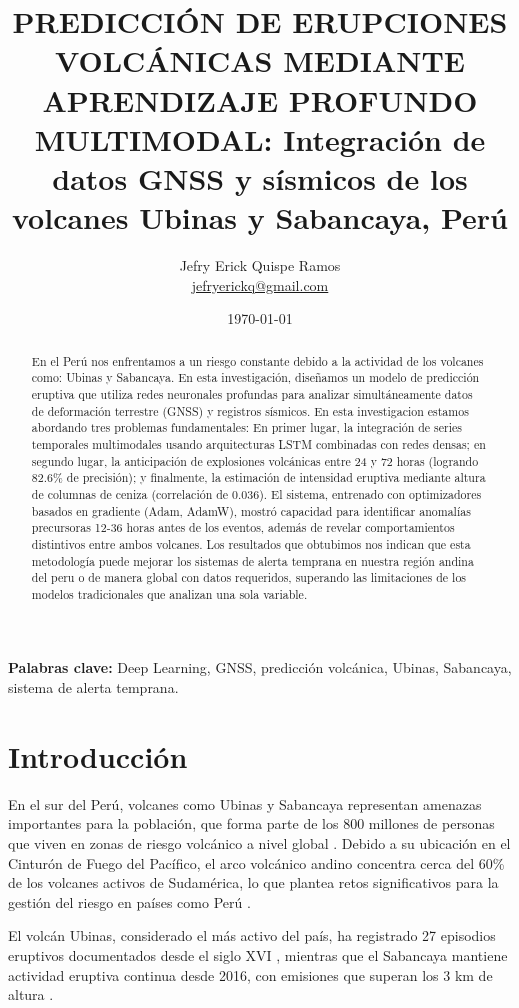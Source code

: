 \documentclass[11pt, a4paper, twocolumn]{article}  %
\title{\bfseries PREDICCIÓN DE ERUPCIONES VOLCÁNICAS MEDIANTE APRENDIZAJE PROFUNDO MULTIMODAL:  Integración de datos GNSS y sísmicos de los volcanes Ubinas y Sabancaya, Perú}
\author{
    Jefry Erick Quispe Ramos \\
    \small \href{mailto:jefryerickq@gmail.com}{jefryerickq@gmail.com} %
}
\date{\today}
\begin{document}
\maketitle



\begin{abstract}
En el Perú nos enfrentamos a un riesgo constante debido a la actividad de los volcanes como: Ubinas y Sabancaya. En esta investigación, diseñamos un modelo de predicción eruptiva que utiliza redes neuronales profundas para analizar simultáneamente datos de deformación terrestre (GNSS) y registros sísmicos. En esta investigacion estamos abordando tres problemas fundamentales: En primer lugar, la integración de series temporales multimodales usando arquitecturas LSTM combinadas con redes densas; en segundo lugar, la anticipación de explosiones volcánicas entre 24 y 72 horas (logrando 82.6\% de precisión); y finalmente, la estimación de intensidad eruptiva mediante altura de columnas de ceniza (correlación de 0.036). El sistema, entrenado con optimizadores basados en gradiente (Adam, AdamW), mostró capacidad para identificar anomalías precursoras 12-36 horas antes de los eventos, además de revelar comportamientos distintivos entre ambos volcanes. Los  resultados que obtubimos nos indican que esta metodología puede mejorar los sistemas de alerta temprana en nuestra región andina del peru o de manera global con datos requeridos, superando las limitaciones de los modelos tradicionales que analizan una sola variable.
\end{abstract}



\textbf{Palabras clave:} Deep Learning, GNSS, predicción volcánica, Ubinas, Sabancaya, sistema de alerta temprana.

\section{Introducción}

En el sur del Perú, volcanes como Ubinas y Sabancaya representan amenazas importantes para la población, que forma parte de los 800 millones de personas que viven en zonas de riesgo volcánico a nivel global \citep{ayris2023global}. Debido a su ubicación en el Cinturón de Fuego del Pacífico, el arco volcánico andino concentra cerca del 60\% de los volcanes activos de Sudamérica, lo que plantea retos significativos para la gestión del riesgo en países como Perú \citep{samaniego2022andes}.

El volcán Ubinas, considerado el más activo del país, ha registrado 27 episodios eruptivos documentados desde el siglo XVI \citep{rivera2021ubinas}, mientras que el Sabancaya mantiene actividad eruptiva continua desde 2016, con emisiones que superan los 3 km de altura \citep{machacca2023sabancaya}.
\end{document}
